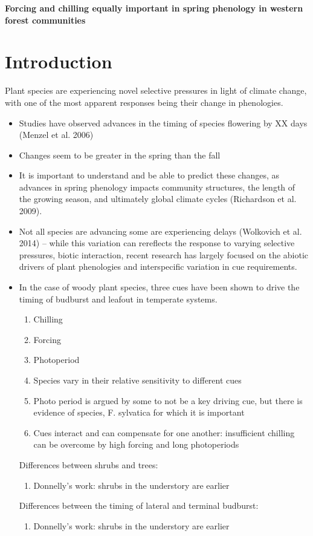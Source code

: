 \documentclass[11pt,letter]{article}
\begin{document}
%
\renewcommand{\refname}{\CHead{}}

{\bf Forcing and chilling equally important in spring phenology in western forest communities}\\ 

\section{Introduction} 

Plant species are experiencing novel selective pressures in light of climate change, with one of the most apparent responses being their change in phenologies. 
\begin{itemize}
\item Studies have observed advances in the timing of species flowering by XX days (Menzel et al. 2006) 
\item Changes seem to be greater in the spring than the fall
\item It is important to understand and be able to predict these changes, as advances in spring phenology impacts community structures, the length of the growing season, and ultimately global climate cycles (Richardson et al. 2009).

\item Not all species are advancing some are experiencing delays (Wolkovich et al. 2014) -- while this variation can rereflects the response to varying selective pressures, biotic interaction, recent research has largely focused on the abiotic drivers of plant phenologies and interspecific variation in cue requirements. 
\item In the case of woody plant species, three cues have been shown to drive the timing of budburst and leafout in temperate systems. 
	\begin{enumerate}
	\item Chilling
	\item Forcing
	\item Photoperiod
	\item Species vary in their relative sensitivity to different cues
	\item Photo period is argued by some to not be a key driving cue, but there is evidence of species, F. sylvatica for which it is important
	\item Cues interact and can compensate for one another: insufficient chilling can be overcome by high forcing and long photoperiods
	\end{enumerate}

Differences between shrubs and trees:
\begin{enumerate}
\item Donnelly's work: shrubs in the understory are earlier
\end{enumerate}

Differences between the timing of lateral and terminal budburst:
\begin{enumerate}
\item Donnelly's work: shrubs in the understory are earlier
\end{enumerate}

\end{itemize}
\end{document}
